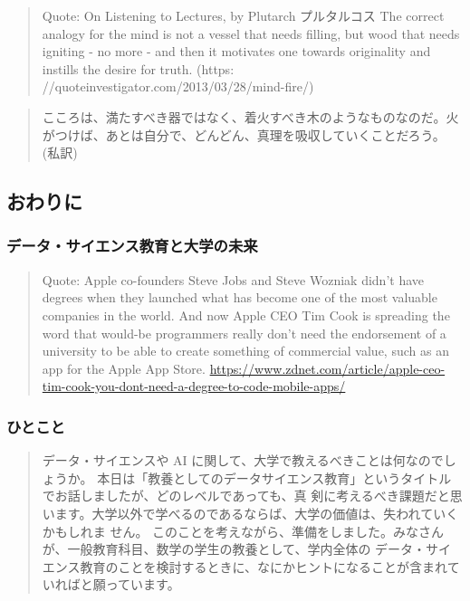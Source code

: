 \documentclass[
]{book}
\theoremstyle{definition}
\theoremstyle{definition}
\theoremstyle{definition}
\theoremstyle{definition}
\theoremstyle{remark}
\begin{document}
\begin{quote}
Quote: On Listening to Lectures, by Plutarch プルタルコス The correct analogy for the mind is not a vessel that needs filling, but wood that needs igniting - no more - and then it motivates one towards originality and instills the desire for truth. (https: //quoteinvestigator.com/2013/03/28/mind-fire/)
\end{quote}

\begin{quote}
こころは、満たすべき器ではなく、着火すべき木のようなものなのだ。火がつけば、あとは自分で、どんどん、真理を吸収していくことだろう。(私訳)
\end{quote}

\hypertarget{ux304aux308fux308aux306b}{%
\subsection{おわりに}\label{ux304aux308fux308aux306b}}

\hypertarget{ux30c7ux30fcux30bfux30b5ux30a4ux30a8ux30f3ux30b9ux6559ux80b2ux3068ux5927ux5b66ux306eux672aux6765}{%
\subsubsection{データ・サイエンス教育と大学の未来}\label{ux30c7ux30fcux30bfux30b5ux30a4ux30a8ux30f3ux30b9ux6559ux80b2ux3068ux5927ux5b66ux306eux672aux6765}}

\begin{quote}
Quote: Apple co-founders Steve Jobs and Steve Wozniak didn't have degrees when they launched what has become one of the most valuable companies in the world.
And now Apple CEO Tim Cook is spreading the word that would-be programmers really don't need the endorsement of a university to be able to create something of commercial value, such as an app for the Apple App Store.
\url{https://www.zdnet.com/article/apple-ceo-tim-cook-you-dont-need-a-degree-to-code-mobile-apps/}
\end{quote}

\hypertarget{ux3072ux3068ux3053ux3068}{%
\subsubsection{ひとこと}\label{ux3072ux3068ux3053ux3068}}

\begin{quote}
データ・サイエンスや AI に関して、大学で教えるべきことは何なのでしょうか。 本日は「教養としてのデータサイエンス教育」というタイトルでお話しましたが、どのレベルであっても、真
剣に考えるべき課題だと思います。大学以外で学べるのであるならば、大学の価値は、失われていくかもしれま
せん。
このことを考えながら、準備をしました。みなさんが、一般教育科目、数学の学生の教養として、学内全体の データ・サイエンス教育のことを検討するときに、なにかヒントになることが含まれていればと願っています。
\end{quote}
\end{document}
